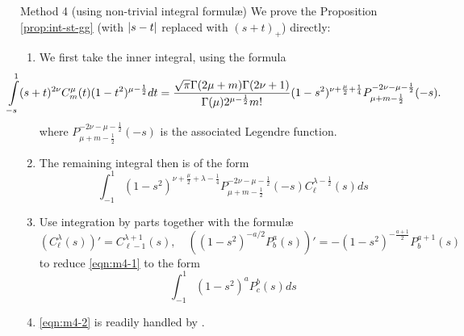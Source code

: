 \documentclass[pdf,notes]{beamer}
\begin{document}
\begin{frame}{Method 4 (using non-trivial integral formul\ae)}
	\scriptsize
	We prove the Proposition \ref{prop:int-st-gg} (with $\left|s-t\right|$ replaced with $(s+t)_+$) directly:
	\begin{enumerate}
		\item We first take the inner integral, using the formula \cite[7.4.11]{kobayashi2011schrodinger}
			{
				\scriptsize
			\begin{equation*}
				\kern-1cm\int_{-s}^1(s+t)^{2\nu} {C}_m^\mu(t)(1-t^2)^{\mu-\frac{1}{2}}dt=
				\frac{\sqrt{\pi}\Gamma(2\mu+m)\Gamma(2\nu+1)}{\Gamma(\mu)2^{\mu-\frac{1}{2}}m!}
				(1-s^2)^{\nu+\frac{\mu}{2}+\frac{1}{4}}P_{\mu+m-\frac{1}{2}}^{-2\nu-\mu-\frac{1}{2}}(-s).
			\end{equation*}
		}
			where $P_{\mu+m-\frac{1}{2}}^{-2\nu-\mu-\frac{1}{2}}(-s)$ is the associated Legendre function. 
		\item The remaining integral then is of the form\begin{equation}\label{eqn:m4-1}
				\int_{-1}^1(1-s^2)^{\nu+\frac{\mu}{2}+\lambda-\frac{1}{4}}P_{\mu+m-\frac{1}{2}}^{-2\nu-\mu-\frac{1}{2}}(-s)C^{\lambda-\frac{1}{2}}_\ell(s)ds
			\end{equation}
		\item Use integration by parts together with the formul\ae
			\begin{equation*}
				\left(C^\lambda_\ell(s)  \right)'=C^{\lambda+1}_{\ell-1}(s),\quad\left((1-s^2)^{-a/2}P^a_b(s) \right)'
			=-(1-s^2)^{-\frac{a+1}{2}}P_b^{a+1}(s)
			\end{equation*}
			to reduce \eqref{eqn:m4-1} to the form
			\begin{equation}\label{eqn:m4-2}
				\int_{-1}^1(1-s^2)^aP^b_c(s)ds
			\end{equation}
		\item \eqref{eqn:m4-2} is readily handled by \cite[7.132.1]{gradshteinryzhik}.
	\end{enumerate}
\end{frame}
\end{document}

